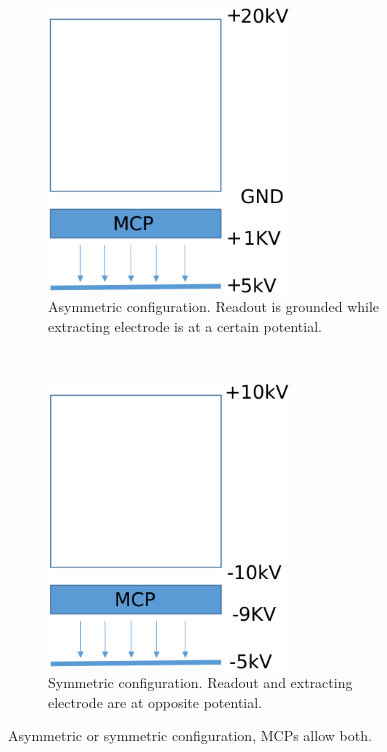 \begin{figure}[!ht]
  \begin{subfigure}[t]{0.5\textwidth}
    \centering
    \captionsetup{width=.8\linewidth}
    \includegraphics[width=0.7\textwidth]{04_IPHI_Test/figures/fig000_setup_hv_asym2}
    \caption{Asymmetric configuration.
      Readout is grounded while extracting electrode is at a certain potential.}
    \label{chap4:setup_hv_asym}
  \end{subfigure}
  ~
  \begin{subfigure}[t]{0.5\textwidth}
    \centering
    \captionsetup{width=.8\linewidth}
    \includegraphics[width=0.7\textwidth]{04_IPHI_Test/figures/fig000_setup_hv_sym}
    \caption{Symmetric configuration. Readout and extracting electrode are at opposite potential.}
    \label{chap4:setup_hv_sym}
  \end{subfigure}
  \caption[Asymmetric or symmetric configuration]{Asymmetric or symmetric configuration, MCPs allow both.}
  \label{chap4:setup_hv}
\end{figure}
